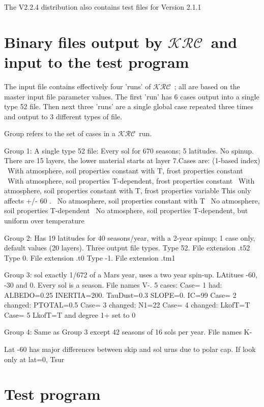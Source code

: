 \documentclass{article}  %
\newcommand{\krc}{$\mathcal{KRC}$~}    %
\begin{document}
The V2.2.4 distribution also contains test files for Version 2.1.1
\section{Binary files output by \krc and input to the test program \label{finput}} %

The input file  contains effectively four 'runs' of \krc; all are based on the master input file parameter values. The first 'run' has 6 cases output into a single type 52 file. Then next three 'runs' are a single global case repeated three times and output to 3 different types of file.

Group refers to the set of cases in a \krc run. 

Group 1: A single type 52 file:  Every sol for 670 seasons; 5 latitudes. No spinup.  There are 15 layers, the lower material starts at layer 7.Cases are: (1-based index)
 \ With atmosphere, soil properties constant with T, frost properties constant
 \ With atmosphere, soil properties T-dependent, frost properties constant
 \ With atmosphere, soil properties constant with T, frost properties variable
\qiii This only affects +/- 60 \qd.
 \ No atmosphere, soil properties constant with T
 \ No atmosphere, soil properties T-dependent
 \ No atmosphere, soil properties T-dependent, but uniform over temperature

Group 2:  Has 19 latitudes for 40 seasons/year, with a 2-year spinup; 
 1 case only, default values (20 layers). 
\qi Three output file types.
\qii Type 52.  File extension .t52
\qii Type 0. File extension .t0
\qii Type -1. File extension .tm1

Group 3: sol exactly 1/672 of a Mars year, uses a two year spin-up. LAtitues -60, -30 and 0. Every sol is a season. File names V-. 5 cases:
\qi Case=  1 had: ALBEDO=0.25 INERTIA=200. TauDust=0.3 SLOPE=0.  IC=99 
\qi Case=       2 changed: PTOTAL=0.5 
\qi Case=       3 changed: N1=22 
\qi Case=       4 changed: LkofT=T 
\qi Case=       5 LkofT=T and degree 1+ set to 0

Group 4: Same as Group 3 except 42 seasons of 16 sols per year. File names K-


Lat -60 has major differences between skip and sol urns due to polar cap. 
If look only at lat=0, Tsur  

 
\section{Test program} %
\end{document}
